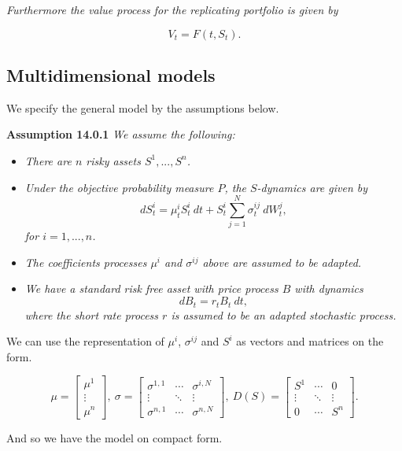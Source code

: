 \documentclass[
]{article}
\providecommand{\tightlist}{%
  \setlength{\itemsep}{0pt}\setlength{\parskip}{0pt}}
\begin{document}
\emph{Furthermore the value process for the replicating portfolio is
given by}

\[
V_t=F(t,S_t).
\]

\hypertarget{multidimensional-models}{%
\subsection{Multidimensional models}\label{multidimensional-models}}

We specify the general model by the assumptions below.

\textbf{Assumption 14.0.1} \emph{We assume the following:}

\begin{itemize}
\tightlist
\item
  \emph{There are \(n\) risky assets \(S^1,...,S^n\).}
\item
  \emph{Under the objective probability measure \(P\), the
  \(S\)-dynamics are given by} \[
    dS_t^i=\mu_t^iS_t^i\ dt +S_t^i\sum_{j=1}^N\sigma_t^{ij}\ dW_t^j,\tag{14.1}
    \] \emph{for \(i=1,...,n\).}
\item
  \emph{The coefficients processes \(\mu^i\) and \(\sigma^{ij}\) above
  are assumed to be adapted.}
\item
  \emph{We have a standard risk free asset with price process \(B\) with
  dynamics} \[
    dB_t=r_tB_t\ dt,\tag{14.2}
    \] \emph{where the short rate process \(r\) is assumed to be an
  adapted stochastic process.}
\end{itemize}

We can use the representation of \(\mu^i\), \(\sigma^{ij}\) and \(S^i\)
as vectors and matrices on the form.

\[
\mu =
\begin{bmatrix}
\mu ^1\\
\vdots\\
\mu ^n
\end{bmatrix},\ \sigma=
\begin{bmatrix}
\sigma^{1,1}& \cdots & \sigma^{i,N}\\
\vdots & \ddots & \vdots\\
\sigma^{n,1}&\cdots&\sigma^{n,N}
\end{bmatrix},\ D(S)=
\begin{bmatrix}
S^{1}& \cdots & 0\\
\vdots & \ddots & \vdots\\
0&\cdots&S^n
\end{bmatrix}.
\]

And so we have the model on compact form.
\end{document}

